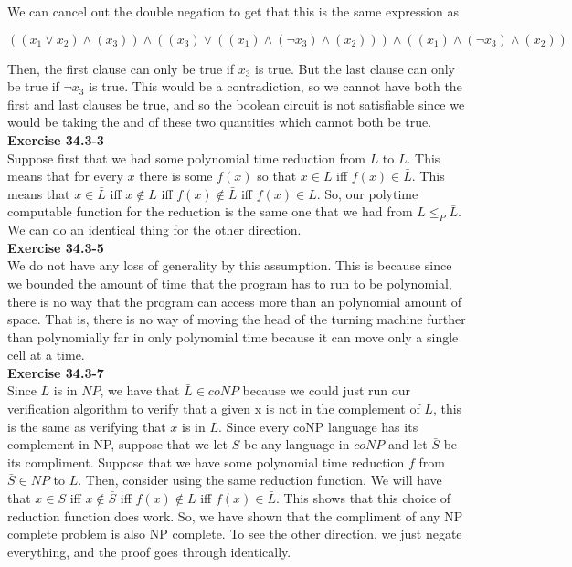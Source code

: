 \documentclass{article}
\begin{document}
We can cancel out the double negation to get that this is the same expression as

\[((x_1\vee x_2)\wedge(x_3))\wedge(( x_3) \vee ((x_1)\wedge(\neg x_3)\wedge(x_2)))\wedge((x_1)\wedge(\neg x_3)\wedge(x_2))\]

Then, the first clause can only be true if $x_3$ is true. But the last clause can only be true if $\neg x_3$ is true. This would be a contradiction, so we cannot have both the first and last clauses be true, and so the boolean circuit is not satisfiable since we would be taking the and of these two quantities which cannot both be true.\\



\noindent\textbf{Exercise 34.3-3}\\

Suppose first that we had some polynomial time reduction from $L$ to $\bar{L}$. This means that for every $x$ there is some $f(x)$ so that $x\in L$ iff $f(x)\in \bar{L}$. This means that $x\in \bar{L}$ iff $x\not\in L$ iff $f(x)\not\in\bar{L}$ iff $f(x)\in L$. So, our polytime computable function for the reduction is the same one that we had from $L\le_P \bar{L}$. We can do an identical thing for the other direction.\\



\noindent\textbf{Exercise 34.3-5}\\
We do not have any loss of generality by this assumption. This is because since we bounded the amount of time that the program has to run to be polynomial, there is no way that the program can access more than an polynomial amount of space. That is, there is no way of moving the head of the turning machine further than polynomially far in only polynomial time because it can move only a single cell at a time.\\


\noindent\textbf{Exercise 34.3-7}\\

Since $L$ is in $NP$, we have that $\bar{L}\in coNP$ because we could just run our verification algorithm to verify that a given x is not in the complement of $L$, this is the same as verifying that $x$ is in $L$. Since every coNP language has its complement in NP, suppose that we let $S$ be any language in $coNP$ and let $\bar{S}$ be its compliment. Suppose that we have some polynomial time reduction $f$ from $\bar{S}\in NP$ to $L$. Then, consider using the same reduction function. We will have that $x\in S$ iff $x\not\in \bar{S}$ iff $f(x)\not\in L$ iff $f(x)\in \bar{L}$. This shows that this choice of reduction function does work. So, we have shown that the compliment of any NP complete problem is also NP complete. To see the other direction, we just negate everything, and the proof goes through identically.\\
\end{document}
